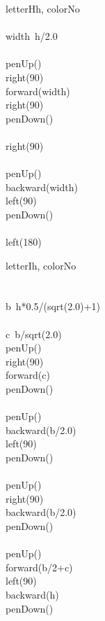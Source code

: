\documentclass[a4paper,10pt]{article}
\begin{document}
\begin{pseudocode}{letterH}{h, colorNo }
\label{letterH}
\\
\\
  width\gets\ h/2.0\\
  \\
  penUp()\\
  right(90)\\
  forward(width)\\
  right(90)\\
  penDown()\\
  \\
  right(90)\\
  \\
  penUp()\\
  backward(width)\\
  left(90)\\
  penDown()\\
  \\
  left(180)\\
\ENDPROCEDURE
\end{pseudocode}


\begin{pseudocode}{letterI}{h, colorNo }
\label{letterI}
\\
\\
  \\
  b\gets\ h*0.5/(sqrt(2.0)+1)\\
  \\
  c\gets\ b/sqrt(2.0)\\
  penUp()\\
  right(90)\\
  forward(c)\\
  penDown()\\
  \\
  penUp()\\
  backward(b/2.0)\\
  left(90)\\
  penDown()\\
  \\
  penUp()\\
  right(90)\\
  backward(b/2.0)\\
  penDown()\\
  \\
  penUp()\\
  forward(b/2+c)\\
  left(90)\\
  backward(h)\\
  penDown()\\
\ENDPROCEDURE
\end{pseudocode}
\end{document}

